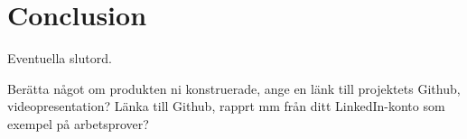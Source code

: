 \section*{Conclusion}
Eventuella slutord.

Berätta något om produkten ni konstruerade, ange en länk till projektets Github\cite{Eklund:2}, videopresentation?
Länka till Github, rapprt mm från ditt LinkedIn-konto som exempel på arbetsprover?\cite{DUMMY:1}